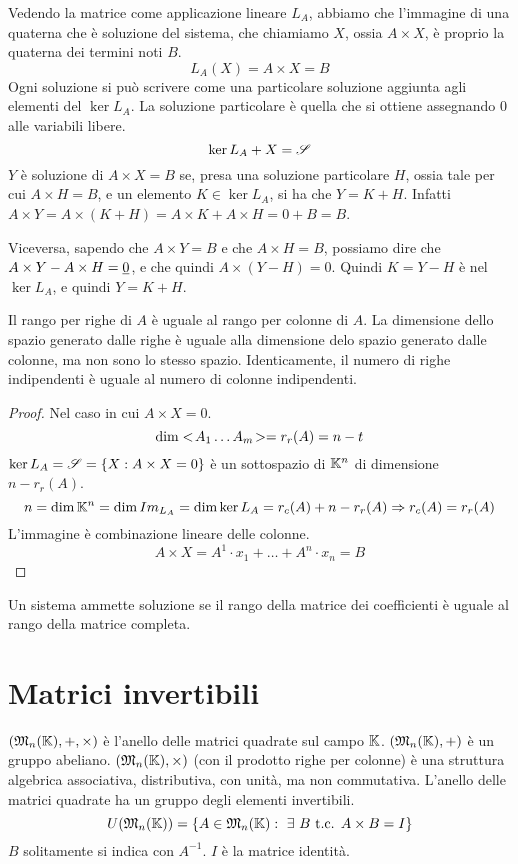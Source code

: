 Vedendo la matrice come applicazione lineare $L_A$, abbiamo che l'immagine di una quaterna che \`e soluzione del sistema, che chiamiamo $X$, ossia $A \times X$, \`e proprio la quaterna dei termini noti $B$.
\[
L_A(X) = A \times X = B
\]
Ogni soluzione si pu\`o scrivere come una particolare soluzione aggiunta agli elementi del $\ker L_A$. La soluzione particolare \`e quella che si ottiene assegnando 0 alle variabili libere.
\[
\ker L_A + X = \mathscr{S}
\]
$Y$ \`e soluzione di $A \times X = B$ se, presa una soluzione particolare $H$, ossia tale per cui $A \times H = B$, e un elemento $K \in \ker L_A$, si ha che $Y = K + H$. Infatti $A \times Y = A \times (K + H) = A \times K + A \times H = 0 + B = B$.

Viceversa, sapendo che $A \times Y = B$ e che $A \times H = B$, possiamo dire che $A \times Y - A \times H = \underline{0}$, e che quindi $A \times (Y - H) = 0$. Quindi $K = Y - H$ \`e nel $\ker L_A$, e quindi $Y = K + H$.

Il rango per righe di $A$ \`e uguale al rango per colonne di $A$. La dimensione dello spazio generato dalle righe \`e uguale alla dimensione delo spazio generato dalle colonne, ma non sono lo stesso spazio. Identicamente, il numero di righe indipendenti \`e uguale al numero di colonne indipendenti.

\begin{proof}
Nel caso in cui $A \times X = 0$.
\[
\dim <\!{A_1 \ldots A_m}\!> = r_r(A) = n - t
\]
$\ker L_A = \mathscr{S} = \{ X : A \times X = 0 \}$ \`e un sottospazio di $\mathbb{K}^n$ di dimensione $n - r_r(A)$.
\[
n = \dim \mathbb{K}^n = \dim Im_{L_A} = \dim \ker L_A = r_c (A) + n - r_r(A) \Rightarrow r_c(A) = r_r(A)
\]
L'immagine \`e combinazione lineare delle colonne.
\[
A \times X = A^1 \cdot x_1 + \ldots + A^n \cdot x_n = B
\]
\end{proof}

\begin{theorem}
Un sistema ammette soluzione se il rango della matrice dei coefficienti \`e uguale al rango della matrice completa.
\end{theorem}

\section{Matrici invertibili}

$(\mathfrak{M}_n (\mathbb{K}), +, \times)$ \`e l'anello delle matrici quadrate sul campo $\mathbb{K}$. $(\mathfrak{M}_n (\mathbb{K}), +)$ \`e un gruppo abeliano. $(\mathfrak{M}_n (\mathbb{K}), \times)$ (con il prodotto righe per colonne) \`e una struttura algebrica associativa, distributiva, con unit\`a, ma non commutativa. L'anello delle matrici quadrate ha un gruppo degli elementi invertibili.
\[
U(\matrices_n (\field)) = \{ A \in \matrices_n (\field) : \exists B \text{ t.c. } A \times B = I \}
\]
$B$ solitamente si indica con $A^{-1}$. $I$ \`e la matrice identit\`a.

